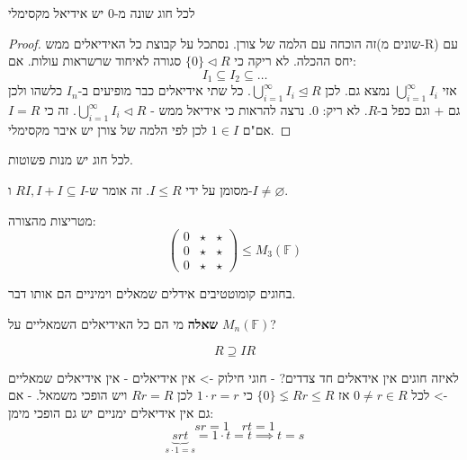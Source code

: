 \documentclass{tstextbook}
\begin{document}
\begin{proposition}
לכל חוג שונה מ-\(0\) יש אידיאל מקסימלי

\end{proposition}
\begin{proof}
זה הוכחה עם הלמה של צורן. נסתכל על קבוצת כל האידיאלים ממש(שונים מ-R) עם יחס ההכלה. לא ריקה כי \(\{ 0 \}\triangleleft R\)
סגורה לאיחוד שרשראות עולות. אם:
$$I_{1}\subseteq I_{2} \subseteq \dots$$
אזי \(\bigcup_{i=1}^{\infty}I_{i}\) נמצא גם. לכן \(\bigcup_{i=1}^{\infty}I_{i}\trianglelefteq R\). כל שתי אידיאלים כבר מופיעים ב-\(I_{n}\) כלשהו ולכן גם \(+\) וגם כפל ב-\(R\). לא ריק: 0.
נרצה להראות כי אידיאל ממש - \(\bigcup_{i=1}^{\infty}I_{i}\triangleleft R\). זה כי \(I=R\) אם"ם \(1 \in I\) לכן לפי הלמה של צורן יש איבר מקסימלי.

\end{proof}
\begin{corollary}
לכל חוג יש מנות פשוטות.

\end{corollary}
\begin{definition}
מסומן על ידי \(I\leq R\). זה אומר ש-\(RI,I+I\subseteq I\) ו-\(I\neq \varnothing\).

\end{definition}
\begin{example}
מטריצות מהצורה:
$$\begin{pmatrix}0 & \star  & \star\\0 & \star  & \star\\0 & \star  & \star
\end{pmatrix}\leq  M_3(\mathbb{F} )$$

\end{example}
\begin{remark}
בחוגים קומוטטיבים אידלים שמאלים וימיניים הם אותו דבר.

\end{remark}
\textbf{שאלה}
מי הם כל האידיאלים השמאליים על \(M_{n}(\mathbb{F})\)?

\begin{definition}
$$R\supseteq IR$$

\end{definition}
לאיזה חוגים אין אידאלים חד צדדים?
- חוגי חילוק -> אין אידיאלים
- אין אידיאלים שמאליים -> לכל \(0\neq r \in R\) אז \(\{ 0 \}\lneq Rr\leq R\) כי \(1\cdot r = r\) לכן \(Rr=R\) ויש הופכי משמאל.
- אם גם אין אידיאלים ימניים יש גם הופכי מימן:
$$sr = 1\quad rt=1$$$$\underbrace{ s r t }_{ s\cdot 1 =s } = 1 \cdot t = t\implies t=s$$
\end{document}
